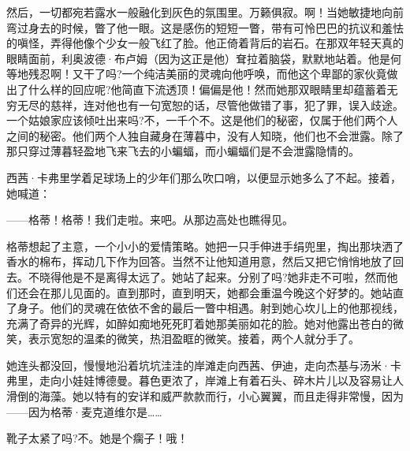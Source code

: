 \par 然后，一切都宛若露水一般融化到灰色的氛围里。万籁俱寂。啊！当她敏捷地向前弯过身去的时候，瞥了他一眼。这是感伤的短短一瞥，带有可怜巴巴的抗议和羞怯的嗔怪，弄得他像个少女一般飞红了脸。他正倚着背后的岩石。在那双年轻天真的眼睛面前，利奥波德·布卢姆（因为这正是他）耷拉着脑袋，默默地站着。他是何等地残忍啊！又干了吗?一个纯洁美丽的灵魂向他呼唤，而他这个卑鄙的家伙竟做出了什么样的回应呢?他简直下流透顶！偏偏是他！然而她那双眼睛里却蕴蓄着无穷无尽的慈祥，连对他也有一句宽恕的话，尽管他做错了事，犯了罪，误入歧途。一个姑娘家应该倾吐出来吗?不，一千个不。这是他们的秘密，仅属于他们两个人之间的秘密。他们两个人独自藏身在薄暮中，没有人知晓，他们也不会泄露。除了那只穿过薄暮轻盈地飞来飞去的小蝙蝠，而小蝙蝠们是不会泄露隐情的。
\par 西茜·卡弗里学着足球场上的少年们那么吹口哨，以便显示她多么了不起。接着，她喊道：
\par ——格蒂！格蒂！我们走啦。来吧。从那边高处也瞧得见。
\par 格蒂想起了主意，一个小小的爱情策略。她把一只手伸进手绢兜里，掏出那块洒了香水的棉布，挥动几下作为回答。当然不让他知道用意，然后又把它悄悄地放了回去。不晓得他是不是离得太远了。她站了起来。分别了吗?她非走不可啦，然而他们还会在那儿见面的。直到那时，直到明天，她都会重温今晚这个好梦的。她站直了身子。他们的灵魂在依依不舍的最后一瞥中相遇。射到她心坎儿上的他那视线，充满了奇异的光辉，如醉如痴地死死盯着她那美丽如花的脸。她对他露出苍白的微笑，表示宽恕的温柔的微笑，热泪盈眶的微笑。接着，两个人就分手了。
\par 她连头都没回，慢慢地沿着坑坑洼洼的岸滩走向西茜、伊迪，走向杰基与汤米·卡弗里，走向小娃娃博德曼。暮色更浓了，岸滩上有着石头、碎木片儿以及容易让人滑倒的海藻。她以特有的安详和威严款款而行，小心翼翼，而且走得非常慢，因为——因为格蒂·麦克道维尔是……
\par 靴子太紧了吗?不。她是个瘸子！哦！
